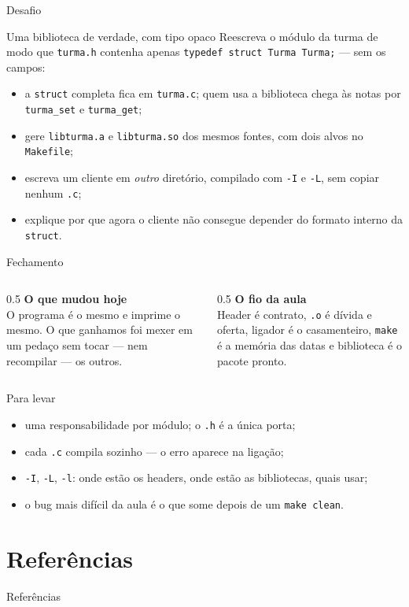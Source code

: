 \documentclass[aspectratio=169]{beamer}
\begin{document}
\begin{frame}{Desafio}
  \begin{block}{Uma biblioteca de verdade, com tipo opaco}
    Reescreva o módulo da turma de modo que \texttt{turma.h} contenha apenas
    \texttt{typedef struct Turma Turma;} --- sem os campos:
    \begin{itemize}
      \item a \texttt{struct} completa fica em \texttt{turma.c}; quem usa a
        biblioteca chega às notas por \texttt{turma\_set} e \texttt{turma\_get};
      \item gere \texttt{libturma.a} e \texttt{libturma.so} dos mesmos
        fontes, com dois alvos no \texttt{Makefile};
      \item escreva um cliente em \emph{outro} diretório, compilado com
        \texttt{-I} e \texttt{-L}, sem copiar nenhum \texttt{.c};
      \item explique por que agora o cliente não consegue depender do
        formato interno da \texttt{struct}.
    \end{itemize}
  \end{block}
\end{frame}

\begin{frame}{Fechamento}
  \begin{columns}[T]
    \begin{column}{0.5\textwidth}
      \textbf{O que mudou hoje}\\[0.3em]
      O programa é o mesmo e imprime o mesmo. O que ganhamos foi mexer em
      um pedaço sem tocar --- nem recompilar --- os outros.
    \end{column}
    \begin{column}{0.5\textwidth}
      \textbf{O fio da aula}\\[0.3em]
      Header é contrato, \texttt{.o} é dívida e oferta, ligador é o
      casamenteiro, \texttt{make} é a memória das datas e biblioteca é o
      pacote pronto.
    \end{column}
  \end{columns}
  \begin{block}{Para levar}
    \begin{itemize}
      \item uma responsabilidade por módulo; o \texttt{.h} é a única porta;
      \item cada \texttt{.c} compila sozinho --- o erro aparece na ligação;
      \item \texttt{-I}, \texttt{-L}, \texttt{-l}: onde estão os headers, onde
        estão as bibliotecas, quais usar;
      \item o bug mais difícil da aula é o que some depois de um
        \texttt{make clean}.
    \end{itemize}
  \end{block}
\end{frame}

\section*{Referências}
\begin{frame}[allowframebreaks]{Referências}
  \nocite{*}
  
  
\end{frame}
\end{document}
